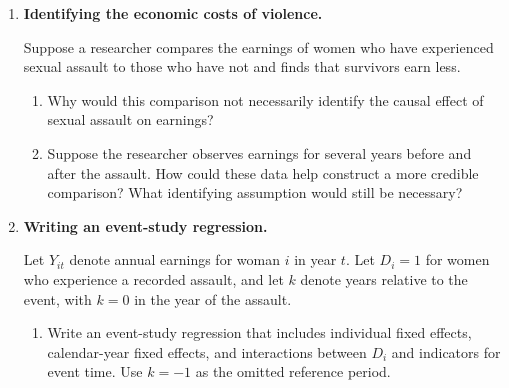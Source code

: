 \documentclass[12pt]{article}
\begin{document}
\begin{enumerate}

\item \textbf{Identifying the economic costs of violence.}

Suppose a researcher compares the earnings of women
who have experienced sexual assault to those who have not
and finds that survivors earn less.

\begin{enumerate}

\item Why would this comparison not necessarily identify
the causal effect of sexual assault on earnings?

\vspace{4cm}

\item Suppose the researcher observes earnings for several
years before and after the assault. How could these data
help construct a more credible comparison?
What identifying assumption would still be necessary?

\vspace{4cm}

\end{enumerate}

\vspace{1cm}

\item \textbf{Writing an event-study regression.}

Let $Y_{it}$ denote annual earnings for woman $i$
in year $t$. Let $D_i=1$ for women who experience
a recorded assault, and let $k$ denote years relative
to the event, with $k=0$ in the year of the assault.

\begin{enumerate}

\item Write an event-study regression that includes
individual fixed effects, calendar-year fixed effects,
and interactions between $D_i$ and indicators for
event time. Use $k=-1$ as the omitted reference period.


\end{enumerate}
\end{enumerate}
\end{document}
